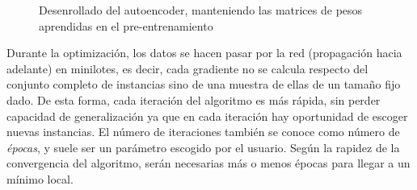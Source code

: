 \begin{figure}[hbtp]
  \caption[Desenrollado del autoencoder]{Desenrollado del autoencoder, manteniendo las matrices de pesos aprendidas en el pre-entrenamiento}
  \label{fig:ae-unroll}
\end{figure}

Durante la optimización, los datos se hacen pasar por la red (propagación hacia adelante) en minilotes, es decir, cada gradiente no se calcula respecto del conjunto completo de instancias sino de una muestra de ellas de un tamaño fijo dado. De esta forma, cada iteración del algoritmo es más rápida, sin perder capacidad de generalización ya que en cada iteración hay oportunidad de escoger nuevas instancias. El número de iteraciones también se conoce como número de \emph{épocas}, y suele ser un parámetro escogido por el usuario. Según la rapidez de la convergencia del algoritmo, serán necesarias más o menos épocas para llegar a un mínimo local.